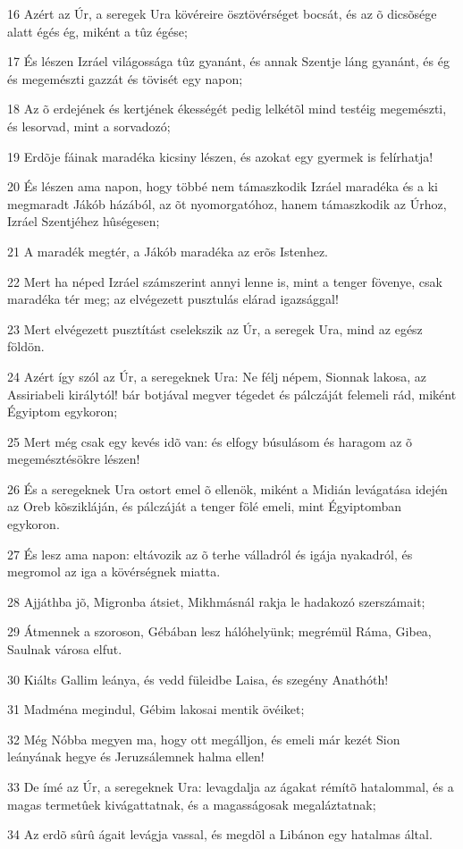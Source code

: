 \par 16 Azért az Úr, a seregek Ura kövéreire ösztövérséget bocsát, és az õ dicsõsége alatt égés ég, miként a tûz égése;
\par 17 És lészen Izráel világossága tûz gyanánt, és annak Szentje láng gyanánt, és ég és megemészti gazzát és tövisét egy napon;
\par 18 Az õ erdejének és kertjének ékességét pedig lelkétõl mind testéig megemészti, és lesorvad, mint a sorvadozó;
\par 19 Erdõje fáinak maradéka kicsiny lészen, és azokat egy gyermek is felírhatja!
\par 20 És lészen ama napon, hogy többé nem támaszkodik Izráel maradéka és a ki megmaradt Jákób házából, az õt nyomorgatóhoz, hanem támaszkodik az Úrhoz, Izráel Szentjéhez hûségesen;
\par 21 A maradék megtér, a Jákób maradéka az erõs Istenhez.
\par 22 Mert ha néped Izráel számszerint annyi lenne is, mint a tenger fövenye, csak maradéka tér meg; az elvégezett pusztulás elárad igazsággal!
\par 23 Mert elvégezett pusztítást cselekszik az Úr, a seregek Ura, mind az egész földön.
\par 24 Azért így szól az Úr, a seregeknek Ura: Ne félj népem, Sionnak lakosa, az Assiriabeli királytól! bár botjával megver tégedet és pálczáját felemeli rád, miként Égyiptom egykoron;
\par 25 Mert még csak egy kevés idõ van: és elfogy búsulásom és haragom az õ megemésztésökre lészen!
\par 26 És a seregeknek Ura ostort emel õ ellenök, miként a Midián levágatása idején az Oreb kõszikláján, és pálczáját a tenger fölé emeli, mint Égyiptomban egykoron.
\par 27 És lesz ama napon: eltávozik az õ terhe válladról és igája nyakadról, és megromol az iga a kövérségnek miatta.
\par 28 Ajjáthba jõ, Migronba átsiet, Mikhmásnál rakja le hadakozó szerszámait;
\par 29 Átmennek a szoroson, Gébában lesz hálóhelyünk; megrémül Ráma, Gibea, Saulnak városa elfut.
\par 30 Kiálts Gallim leánya, és vedd füleidbe Laisa, és szegény Anathóth!
\par 31 Madména megindul, Gébim lakosai mentik övéiket;
\par 32 Még Nóbba megyen ma, hogy ott megálljon, és emeli már kezét Sion leányának hegye és Jeruzsálemnek halma ellen!
\par 33 De ímé az Úr, a seregeknek Ura: levagdalja az ágakat rémítõ hatalommal, és a magas termetûek kivágattatnak, és a magasságosak megaláztatnak;
\par 34 Az erdõ sûrû ágait levágja vassal, és megdõl a Libánon egy hatalmas által.

